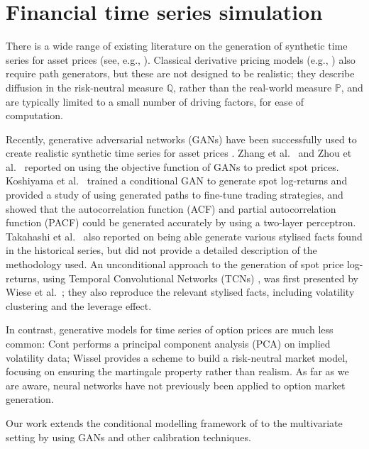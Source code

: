 \documentclass[]{article} %
\begin{document}
\section{Financial time series simulation}
\label{sec:related_work}
There is a wide range of existing literature on the generation of synthetic time
series for asset prices (see, e.g., \cite{Francq2010}). Classical derivative pricing models 
(e.g., \cite{BlackScholes1973, Dupire1994, Heston93}) also require 
path generators, but these are not designed to be realistic; they describe diffusion in the 
risk-neutral measure $\mathbb{Q}$, rather than the real-world measure $\mathbb{P}$, and are
typically limited to a small number of driving factors, for ease of computation.

Recently, generative adversarial networks (GANs) \cite{Goodfellow2014} have been successfully
used to create realistic synthetic time series for asset prices 
\cite{Koshiyama2019, Takahashi2019, Wiese2019, Zhang2019, Zhou2018}. 
Zhang et al.~\cite{Zhang2019} and Zhou et al.~\cite{Zhou2018} reported on using the objective 
function of GANs to predict spot prices. Koshiyama et al.~\cite{Koshiyama2019} trained a conditional 
GAN to generate spot log-returns and provided a study of using generated paths to fine-tune trading 
strategies, and showed that the autocorrelation function (ACF) and partial autocorrelation function 
(PACF) could be generated accurately by using a two-layer perceptron. Takahashi et 
al.~\cite{Takahashi2019} also reported on being able generate various stylised facts \cite{Cont2002} 
found in the historical series, but did not provide a detailed description of the methodology used. 
An unconditional approach to the generation of spot price log-returns, using Temporal 
Convolutional Networks (TCNs) \cite{Oord2016}, was first presented by Wiese et al.~\cite{Wiese2019}; 
they also reproduce the relevant stylised facts, including volatility clustering and the leverage effect. 

In contrast, generative models for time series of option prices are much less common:
Cont \cite{Cont2002} performs a principal component analysis (PCA) on implied volatility data; 
Wissel \cite{Wissel2007} provides a scheme to build a risk-neutral market model, focusing on 
ensuring the martingale property rather than realism. As far as we are aware, neural networks have not 
previously been applied to option market generation. 

Our work extends the conditional modelling framework of \cite{Koshiyama2019} to the multivariate 
setting by using GANs and other calibration techniques. 
\end{document}

